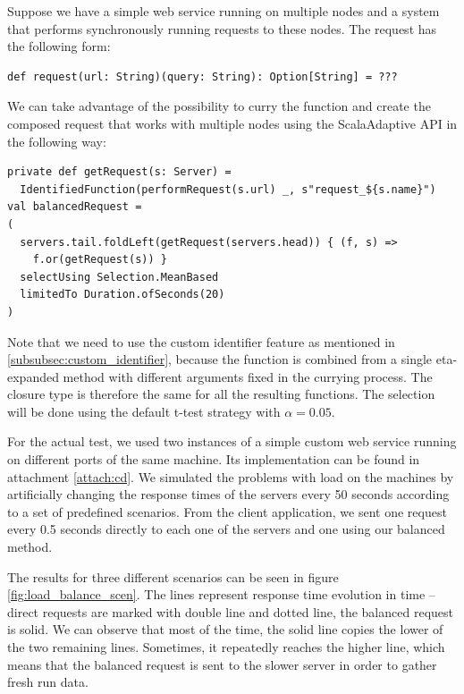 Suppose we have a simple web service running on multiple nodes and a system that performs synchronously running requests to these nodes. The request has the following form:

\lstset{style=Scala}
\begin{lstlisting}
def request(url: String)(query: String): Option[String] = ???
\end{lstlisting}

We can take advantage of the possibility to curry the function and create the composed request that works with multiple nodes using the ScalaAdaptive API in the following way:

\lstset{style=Scala}
\begin{lstlisting}
private def getRequest(s: Server) = 
  IdentifiedFunction(performRequest(s.url) _, s"request_${s.name}")
val balancedRequest =
(
  servers.tail.foldLeft(getRequest(servers.head)) { (f, s) =>
    f.or(getRequest(s)) }
  selectUsing Selection.MeanBased
  limitedTo Duration.ofSeconds(20)
)
\end{lstlisting}

Note that we need to use the custom identifier feature as mentioned in \ref{subsubsec:custom_identifier}, because the function is combined from a single eta-expanded method with different arguments fixed in the currying process. The closure type is therefore the same for all the resulting functions. The selection will be done using the default t-test strategy with $\alpha = 0.05$.

For the actual test, we used two instances of a simple custom web service running on different ports of the same machine. Its implementation can be found in attachment \ref{attach:cd}. We simulated the problems with load on the machines by artificially changing the response times of the servers every 50 seconds according to a set of predefined scenarios. From the client application, we sent one request every 0.5 seconds directly to each one of the servers and one using our balanced method. 

The results for three different scenarios can be seen in figure \ref{fig:load_balance_scen}. The lines represent response time evolution in time -- direct requests are marked with double line and dotted line, the balanced request is solid. We can observe that most of the time, the solid line copies the lower of the two remaining lines. Sometimes, it repeatedly reaches the higher line, which means that the balanced request is sent to the slower server in order to gather fresh run data.

